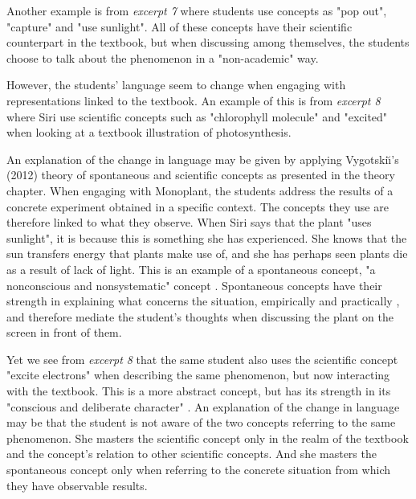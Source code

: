 Another example is from \emph{excerpt 7} where students use concepts as "pop out", "capture" and "use sunlight". All of these concepts have their scientific counterpart in the textbook, but when discussing among themselves, the students choose to talk about the phenomenon in a "non-academic" way. 

However, the students' language seem to change when engaging with representations linked to the textbook. An example of this is from \emph{excerpt 8} where Siri use scientific concepts such as "chlorophyll molecule" and "excited" when looking at a textbook illustration of photosynthesis. 

An explanation of the change in language may be given by applying Vygotski{\u\i}'s (2012) theory of spontaneous and scientific concepts as presented in the theory chapter. When engaging with Monoplant, the students address the results of a concrete experiment obtained in a specific context. The concepts they use are therefore linked to what they observe. When Siri says that the plant "uses sunlight", it is because this is something she has experienced. She knows that the sun transfers energy that plants make use of, and she has perhaps seen plants die as a result of lack of light. This is an example of a spontaneous concept, "a nonconscious and nonsystematic" concept \citep{vygotsky2012thought}. Spontaneous concepts have their strength in explaining what concerns the situation, empirically and practically \citep{vygotsky2012thought}, and  therefore mediate the student's thoughts when discussing the plant on the screen in front of them. 


Yet we see from \emph{excerpt 8} that the same student also uses the scientific concept "excite electrons" when describing the same phenomenon, but now interacting with the textbook. This is a more abstract concept, but has its strength in its "conscious and deliberate character" \citep{vygotsky2012thought}. An explanation of the change in language may be that the student is not aware of the two concepts referring to the same phenomenon. She masters the scientific concept only in the realm of the textbook and the concept's relation to other scientific concepts. And she masters the spontaneous concept only when referring to the concrete situation from which they have observable results. 

